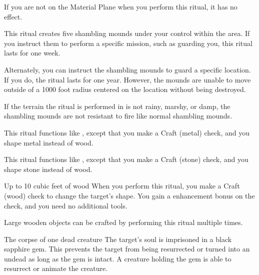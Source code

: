 If you are not on the Material Plane when you perform this ritual, it has no effect.

\spellline
\spelleffect This ritual creates five shambling mounds under your control within the area. If you instruct them to perform a specific mission, such as guarding you, this ritual lasts for one week.

Alternately, you can instruct the shambling mounds to guard a specific location. If you do, the ritual lasts for one year. However, the mounds are unable to move outside of a 1000 foot radius centered on the location without being destroyed.

\spellnotes If the terrain the ritual is performed in is not rainy, marshy, or damp, the shambling mounds are not resistant to fire like normal shambling mounds.

\spellspecial This ritual functions like , except that you make a Craft (metal) check, and you shape metal instead of wood. 

\spellspecial This ritual functions like , except that you make a Craft (stone) check, and you shape stone instead of wood.

\begin{spelltarget}{Up to 10 cubic feet of wood}
    \spelleffect When you perform this ritual, you make a Craft (wood) check to change the target's shape. You gain a  enhancement bonus on the check, and you need no additional tools.
\end{spelltarget}
\spellnotes Large wooden objects can be crafted by performing this ritual multiple times.

\spellrng{\rngclose}
\begin{spelltarget}{The corpse of one dead creature}
    \spelleffect The target's soul is imprisoned in a black sapphire gem. This prevents the target from being resurrected or turned into an undead as long as the gem is intact. A creature holding the gem is able to resurrect or animate the creature.
\end{spelltarget}

